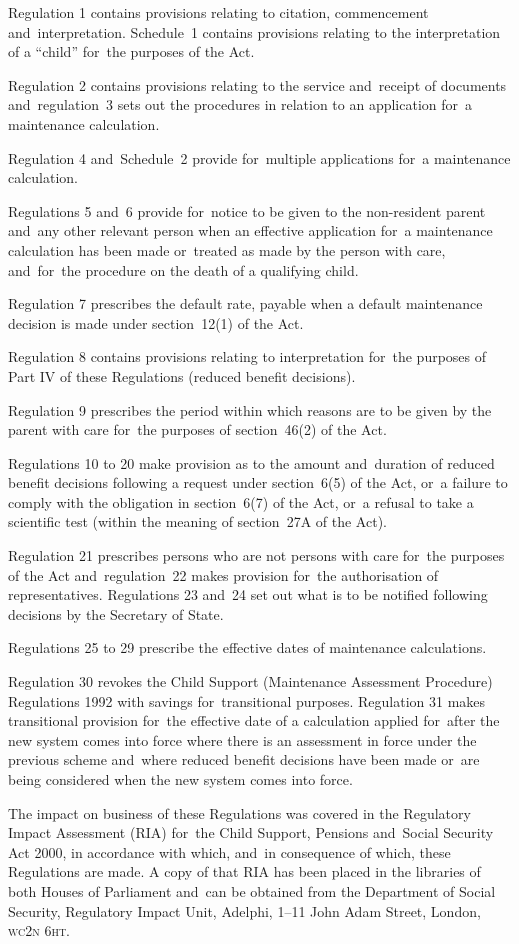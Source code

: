 \documentclass[12pt,a4paper]{article}
\begin{document}
Regulation 1 contains provisions relating to citation, commencement and~interpretation. Schedule~1 contains provisions relating to the interpretation of a “child” for~the purposes of the Act.

Regulation 2 contains provisions relating to the service and~receipt of documents and~regulation~3 sets out the procedures in relation to an application for~a maintenance calculation.

Regulation 4 and~Schedule~2 provide for~multiple applications for~a maintenance calculation.

Regulations 5 and~6 provide for~notice to be given to the non-resident parent and~any other relevant person when an effective application for~a maintenance calculation has been made or~treated as made by the person with care, and~for~the procedure on the death of a qualifying child.

Regulation 7 prescribes the default rate, payable when a default maintenance decision is made under section~12(1) of the Act.

Regulation 8 contains provisions relating to interpretation for~the purposes of Part IV of these Regulations (reduced benefit decisions).

Regulation 9 prescribes the period within which reasons are to be given by the parent with care for~the purposes of section~46(2) of the Act.

Regulations 10 to 20 make provision as to the amount and~duration of reduced benefit decisions following a request under section~6(5) of the Act, or~a failure to comply with the obligation in section~6(7) of the Act, or~a refusal to take a scientific test (within the meaning of section~27A of the Act).

Regulation 21 prescribes persons who are not persons with care for~the purposes of the Act and~regulation~22 makes provision for~the authorisation of representatives. Regulations 23 and~24 set out what is to be notified following decisions by the Secretary of State.

Regulations 25 to 29 prescribe the effective dates of maintenance calculations.

Regulation 30 revokes the Child Support (Maintenance Assessment Procedure) Regulations 1992 with savings for~transitional purposes. Regulation 31 makes transitional provision for~the effective date of a calculation applied for~after the new system comes into force where there is an assessment in force under the previous scheme and~where reduced benefit decisions have been made or~are being considered when the new system comes into force.

The impact on business of these Regulations was covered in the Regulatory Impact Assessment (RIA) for~the Child Support, Pensions and~Social Security Act 2000, in accordance with which, and~in consequence of which, these Regulations are made. A copy of that RIA has been placed in the libraries of both Houses of Parliament and~can be obtained from the Department of Social Security, Regulatory Impact Unit, Adelphi, 1–11 John Adam Street, London, \textsc{\lowercase{WC2N 6HT}}. 
\end{document}
